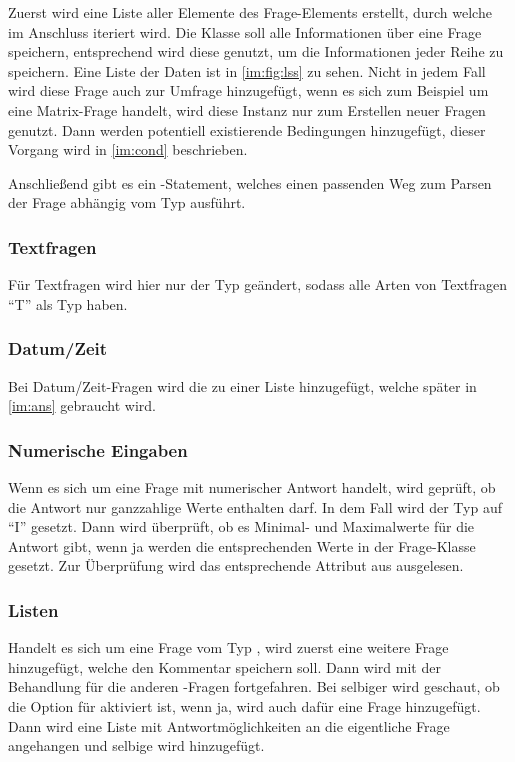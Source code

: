 Zuerst wird eine Liste aller  Elemente des Frage-Elements erstellt, durch welche im Anschluss iteriert wird.
Die Klasse  soll alle Informationen über eine Frage speichern, entsprechend wird diese genutzt, um die Informationen jeder Reihe zu speichern.
Eine Liste der Daten ist in \cref{im:fig:lss} zu sehen.
Nicht in jedem Fall wird diese Frage auch zur Umfrage hinzugefügt, wenn es sich zum Beispiel um eine Matrix-Frage handelt, wird diese Instanz nur zum Erstellen neuer Fragen genutzt.
Dann werden potentiell existierende Bedingungen hinzugefügt, dieser Vorgang wird in \cref{im:cond} beschrieben.

Anschließend gibt es ein -Statement, welches einen passenden Weg zum Parsen der Frage abhängig vom Typ ausführt.

\subsubsection{Textfragen}
Für Textfragen wird hier nur der Typ geändert, sodass alle Arten von Textfragen \enquote{T} als Typ haben.

\subsubsection{Datum/Zeit}
Bei Datum/Zeit-Fragen wird die  zu einer Liste hinzugefügt, welche später in \cref{im:ans} gebraucht wird.

\subsubsection{Numerische Eingaben}
Wenn es sich um eine Frage mit numerischer Antwort handelt, wird geprüft, ob die Antwort nur ganzzahlige Werte enthalten darf. In dem Fall wird der Typ auf \enquote{I} gesetzt. 
Dann wird überprüft, ob es Minimal- und Maximalwerte für die Antwort gibt, wenn ja werden die entsprechenden Werte in der Frage-Klasse gesetzt.
Zur Überprüfung wird das entsprechende Attribut aus  ausgelesen.

\subsubsection{Listen}
Handelt es sich um eine Frage vom Typ , wird zuerst eine weitere Frage hinzugefügt, welche den Kommentar speichern soll.
Dann wird mit der Behandlung für die anderen -Fragen fortgefahren.
Bei selbiger wird geschaut, ob die Option für  aktiviert ist, wenn ja, wird auch dafür eine Frage hinzugefügt.
Dann wird eine Liste mit Antwortmöglichkeiten an die eigentliche Frage angehangen und selbige wird hinzugefügt.

